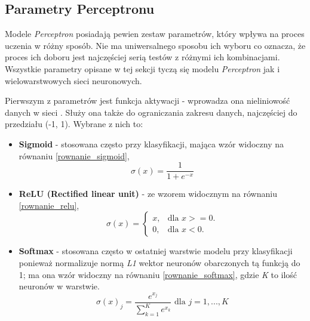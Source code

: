\documentclass[12pt]{aghdpl}
\begin{document}
			\subsection{Parametry Perceptronu} \label{parametry_perceptronu}
			Modele \textit{Perceptron} posiadają pewien zestaw parametrów, który wpływa na proces uczenia w różny sposób. Nie ma uniwersalnego sposobu ich wyboru co oznacza, że proces ich doboru jest najczęściej serią testów z różnymi ich kombinacjami. Wszystkie parametry opisane w tej sekcji tyczą się modelu \textit{Perceptron} jak i wielowarstwowych sieci neuronowych.
			
			Pierwszym z parametrów jest funkcja aktywacji - wprowadza ona nieliniowość danych w sieci \cite{activation_functions_1}\cite{activation_functions_2}. Służy ona także do ograniczania zakresu danych, najczęściej do przedziału (-1, 1). Wybrane z nich to:
			\begin{itemize}
			
			\item\textbf{Sigmoid} - stosowana często przy klasyfikacji, mająca wzór widoczny na równaniu \ref{rownanie_sigmoid},
			\begin{equation} \label{rownanie_sigmoid}
			\sigma(x) = \frac{1}{1 + e^{-x}}
			\end{equation}
			
			\item\textbf{ReLU (Rectified linear unit)} - ze wzorem widocznym na równaniu \ref{rownanie_relu},
			\begin{equation} \label{rownanie_relu}
			\sigma(x) = 
				\begin{cases}
					x, & \text{dla } x >= 0. \\
					0, & \text{dla } x < 0.
				\end{cases}
			\end{equation}
			
			\item\textbf{Softmax} -	stosowana często w ostatniej warstwie modelu przy klasyfikacji ponieważ normalizuje normą \textit{L1} wektor neuronów obarczonych tą funkcją do 1; ma ona wzór widoczny na równaniu \ref{rownanie_softmax}, gdzie \textit{K} to ilość neuronów w warstwie.
			\begin{equation} \label{rownanie_softmax}
			\sigma(x)_j = \frac{e^{x_j}}{\sum_{k = 1}^K e^{x_k}}\text{ dla } j = 1, ..., K
			\end{equation}
			\end{itemize}
			
\end{document}
